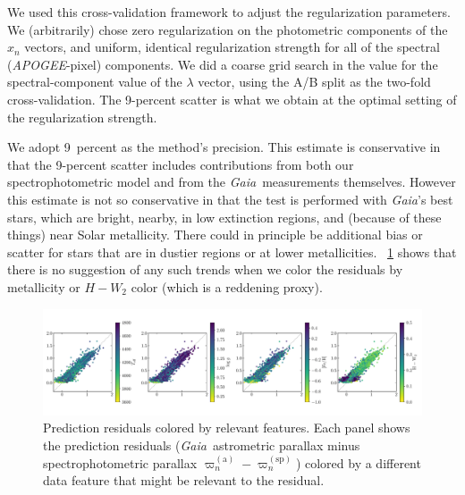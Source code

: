 \documentclass[modern]{aastex62}
\newcommand{\acronym}[1]{{\small{#1}}}
\newcommand{\project}[1]{\textsl{#1}}
\newcommand{\apogee}{\project{\acronym{APOGEE}}}
\newcommand{\gaia}{\project{Gaia}}
\newcommand{\gparallax}{\varpi^{(\mathrm{a})}}
\newcommand{\sparallax}{\varpi^{(\mathrm{sp})}}
\begin{document}
We used this cross-validation framework to adjust the regularization parameters.
We (arbitrarily) chose zero regularization on the photometric components of the
$x_n$ vectors, and uniform, identical regularization strength for all of the
spectral (\apogee-pixel) components.
We did a coarse grid search in the value for the spectral-component value of the
$\lambda$ vector, using the A/B split as the two-fold cross-validation.
The 9-percent scatter is what we obtain at the optimal setting of the regularization
strength.

We adopt 9~percent as the method's precision.
This estimate is conservative in that the 9-percent scatter includes contributions
from both our spectrophotometric model and from the \gaia\ measurements themselves.
However this estimate is not so conservative in that the test is performed with
\gaia's best stars, which are bright, nearby, in low extinction regions, and
(because of these things) near Solar metallicity.
There could in principle be additional bias or scatter for stars that are in dustier
regions or at lower metallicities.
\figurename~\ref{fig:residuals} shows that
there is no suggestion of any such trends when we color the residuals by metallicity
or $H-W_2$ color (which is a reddening proxy).
\begin{figure}
\includegraphics[width=\textwidth]{./residuals_training.pdf}
\caption{Prediction residuals colored by relevant features.
  Each panel shows the prediction residuals (\gaia\ astrometric parallax minus
  spectrophotometric parallax $\gparallax_n-\sparallax_n$) colored by a different
  data feature that might be relevant to the residual.\label{fig:residuals}}
\end{figure}
\end{document}
